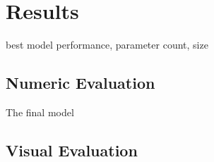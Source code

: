 \section{Results}

best model performance, parameter count, size

\subsection{Numeric Evaluation}

The final model 

\subsection{Visual Evaluation}

\newpage